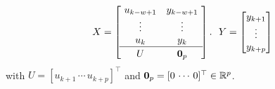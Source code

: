 \documentclass{ifacconf}
\begin{document}
\[
     X = \left[~\begin{matrix} 
     u_{k-w+1} & y_{k-w+1}
     \\ 
     \vdots & \vdots
     \\ 
     u_{k} & y_{k}
     \\
     \hline
     U & {\bf 0}_p\rule{0pt}{10pt}
     \end{matrix}~\right].
     \ \ 
     Y =\begin{bmatrix}
             y_{k+1}\\
             \vdots \\
             y_{k+p}
           \end{bmatrix}
 \]
with $U = [u_{k+1} \, \cdots \, u_{k+p}]^\top$ and ${\bf 0}_p = [0 \, \cdots \, 0]^\top\in\mathbb{R}^p$.
\end{document}
